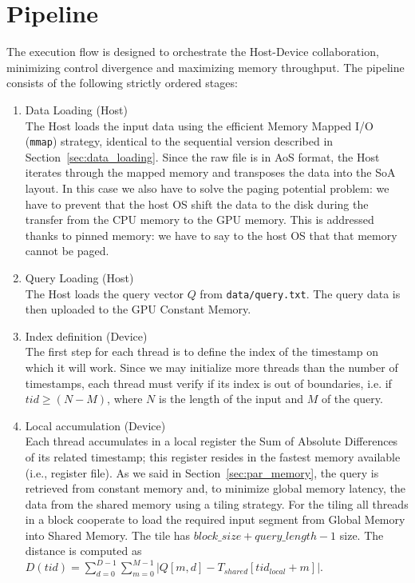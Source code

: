 \section{Pipeline}
The execution flow is designed to orchestrate the Host-Device collaboration, minimizing control divergence and maximizing memory throughput. The pipeline consists of the following strictly ordered stages:
\begin{enumerate}
    \item Data Loading (Host) \\
        The Host loads the input data using the efficient Memory Mapped I/O (\texttt{mmap}) strategy, identical to the sequential version described in Section~\ref{sec:data_loading}. Since the raw file is in AoS format, the Host iterates through the mapped memory and transposes the data into the SoA layout. In this case we also have to solve the paging potential problem: we have to prevent that the host OS shift the data to the disk during the transfer from the CPU memory to the GPU memory. This is addressed thanks to pinned memory: we have to say to the host OS that that memory cannot be paged.
    \item Query Loading (Host) \\
        The Host loads the query vector $Q$ from \texttt{data/query.txt}. The query data is then uploaded to the GPU Constant Memory.
    \item Index definition (Device) \\
        The first step for each thread is to define the index of the timestamp on which it will work. Since we may initialize more threads than the number of timestamps, each thread must verify if its index is out of boundaries, i.e. if $tid \geq (N - M)$, where $N$ is the length of the input and $M$ of the query.
    \item Local accumulation (Device) \\
        Each thread accumulates in a local register the Sum of Absolute Differences of its related timestamp; this register resides in the fastest memory available (i.e., register file). As we said in Section~\ref{sec:par_memory}, the query is retrieved from constant memory and, to minimize global memory latency, the data from the shared memory using a tiling strategy. For the tiling all threads in a block cooperate to load the required input segment from Global Memory into Shared Memory. The tile has $block\_size + query\_length - 1$ size. The distance is computed as $D(tid) = \sum_{d=0}^{D-1} \sum_{m=0}^{M-1} \left|Q[m, d] - T_{shared}[tid_{local} + m] \right|$.

\end{enumerate}
